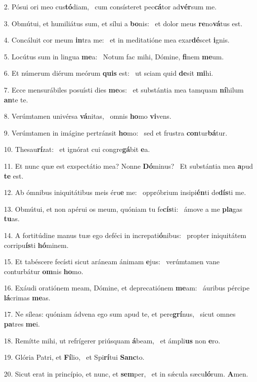 2. Pósui ori meo cus\textbf{tó}diam, \ast\  cum consísteret pec\textbf{cá}tor ad\textbf{vér}sum me.\

3. Obmútui, et humiliátus sum, et sílui a \textbf{bo}nis: \ast\  et dolor meus \textbf{re}no\textbf{vá}tus est.\

4. Concáluit cor meum \textbf{in}tra me: \ast\  et in meditatióne mea exar\textbf{dé}scet \textbf{i}gnis.\

5. Locútus sum in lingua \textbf{me}a: \ast\  Notum fac mihi, Dómine, \textbf{fi}nem \textbf{me}um.\

6. Et númerum diérum meórum \textbf{quis} est: \ast\  ut sciam quid \textbf{de}sit \textbf{mi}hi.\

7. Ecce mensurábiles posuísti dies \textbf{me}os: \ast\  et substántia mea tamquam \textbf{ní}hilum \textbf{an}te te.\

8. Verúmtamen univérsa \textbf{vá}nitas, \ast\  omnis \textbf{ho}mo \textbf{vi}vens.\

9. Verúmtamen in imágine pertránsit \textbf{ho}mo: \ast\  sed et frustra \textbf{con}tur\textbf{bá}tur.\

10. Thesau\textbf{rí}zat: \ast\  et ignórat cui congre\textbf{gá}bit \textbf{e}a.\

11. Et nunc quæ est exspectátio mea? Nonne \textbf{Dó}minus? \ast\  Et substántia mea \textbf{a}pud \textbf{te} est.\

12. Ab ómnibus iniquitátibus meis éru\textbf{e} me: \ast\  oppróbrium insipi\textbf{én}ti de\textbf{dís}ti me.\

13. Obmútui, et non apérui os meum, quóniam tu fe\textbf{cís}ti: \ast\  ámove a me \textbf{pla}gas \textbf{tu}as.\

14. A fortitúdine manus tuæ ego deféci in increpati\textbf{ó}nibus: \ast\  propter iniquitátem corripu\textbf{ís}ti \textbf{hó}minem.\

15. Et tabéscere fecísti sicut aráneam ánimam \textbf{e}jus: \ast\  verúmtamen vane conturbátur \textbf{om}nis \textbf{ho}mo.\

16. Exáudi oratiónem meam, Dómine, et deprecatiónem \textbf{me}am: \ast\  áuribus pércipe \textbf{lá}crimas \textbf{me}as.\

17. Ne síleas: quóniam ádvena ego sum apud te, et pere\textbf{grí}nus, \ast\  sicut omnes \textbf{pa}tres \textbf{me}i.\

18. Remítte mihi, ut refrígerer priúsquam \textbf{á}beam, \ast\  et ámpli\textbf{us} non \textbf{e}ro.\

19. Glória Patri, et \textbf{Fí}lio, \ast\  et Spi\textbf{rí}tui \textbf{Sanc}to.\

20. Sicut erat in princípio, et nunc, et \textbf{sem}per, \ast\  et in sǽcula sæcu\textbf{ló}rum. \textbf{A}men.\


